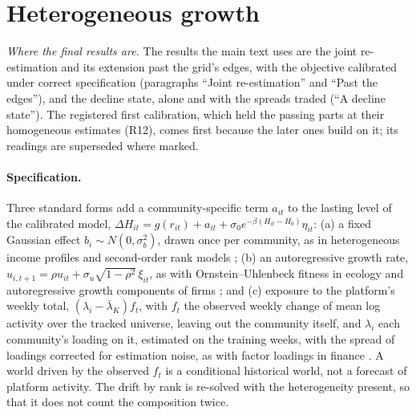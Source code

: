 \documentclass[10pt]{article}
\begin{document}
\section{Heterogeneous growth}\label{sec:hetero}
\emph{Where the final results are.} The results the main text uses are the joint re-estimation and its extension past the grid's edges, with the objective calibrated under correct specification (paragraphs ``Joint re-estimation'' and ``Past the edges''), and the decline state, alone and with the spreads traded (``A decline state''). The registered first calibration, which held the passing parts at their homogeneous estimates (R12), comes first because the later ones build on it; its readings are superseded where marked.
\paragraph{Specification.} Three standard forms add a community-specific term $a_{it}$ to the lasting level of the calibrated model, $\Delta H_{it} = g(r_{it}) + a_{it} + \sigma_0 e^{-\beta(H_{it}-H_0)}\eta_{it}$: (a) a fixed Gaussian effect $b_i \sim N(0,\sigma_b^2)$, drawn once per community, as in heterogeneous income profiles and second-order rank models \cite{guvenen2009,guvenen2021,fik2013}; (b) an autoregressive growth rate, $u_{i,t+1} = \rho u_{it} + \sigma_u\sqrt{1-\rho^2}\,\xi_{it}$, as with Ornstein--Uhlenbeck fitness in ecology and autoregressive growth components of firms \cite{mallmin2026,sterk2021,gllm2016}; and (c) exposure to the platform's weekly total, $(\lambda_i - \bar\lambda_K) f_t$, with $f_t$ the observed weekly change of mean log activity over the tracked universe, leaving out the community itself, and $\lambda_i$ each community's loading on it, estimated on the training weeks, with the spread of loadings corrected for estimation noise, as with factor loadings in finance \cite{carhart1997,ichiba2011}. A world driven by the observed $f_t$ is a conditional historical world, not a forecast of platform activity. The drift by rank is re-solved with the heterogeneity present, so that it does not count the composition twice.
\end{document}
